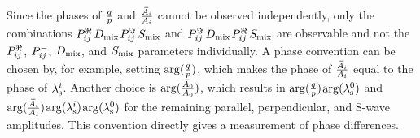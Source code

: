 Since the phases of $\qp$ and $\frac{\Abari}{\Ai}$ cannot be observed independently, only the combinations $\Pre\,\Dm$\textplus$\Pim\,\Sm$
and $\Pim\,\Dm$\textminus$\Pre\,\Sm$ are observable and not the $\Pre$, $\Pmn$, $\Dm$, and $\Sm$ parameters individually. A phase
convention can be chosen by, for example, setting $\arg(\qpAlt)$, which makes the phase of $\frac{\Abari}{\Ai}$ equal to the
phase of $\lamsi$. Another choice is $\arg(\frac{\Abari[\text{0}]}{\Ai[\text{0}]})$, which results in
$\arg(\qpAlt)$\texteq$\arg(\lamsi[\text{0}])$ and $\arg(\frac{\Abari}{\Ai})$\texteq$\arg(\lamsi)$\textminus$\arg(\lamsi[\text{0}])$ for the
remaining parallel, perpendicular, and S-wave amplitudes. This convention directly gives a measurement of phase differences.
